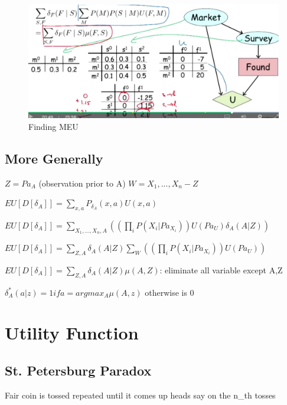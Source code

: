 \documentclass{book}
\begin{document}
\begin{figure}[h]
\centering
\includegraphics[width=0.7\linewidth]{./figures/MEU}
\caption{Finding MEU}
\label{fig:MEU}
\end{figure}

\subsection{More Generally}

$Z = Pa_A$ (observation prior to A)
$W = {X_1,...,X_n} - Z$

$EU[D[\delta_A]] = \sum_{x,a} P_{\delta_A}(x,a) U(x,a)$ 

$EU[D[\delta_A]]= \sum_{X_1,...,X_n,A}((\prod_{i} P(X_i|Pa_{X_i}))U(Pa_U)\delta_A(A|Z))$

$EU[D[\delta_A]]= \sum_{Z,A} \delta_A(A|Z) \sum_{W}((\prod_i P(X_i|Pa_{X_i}))U(Pa_U))$

$EU[D[\delta_A]]= \sum_{Z,A} \delta_A(A|Z) \mu(A,Z) $: eliminate all variable except A,Z

$\delta_A^*(a|z) = 1 if a=argmax_A\mu(A,z)$ otherwise is 0


\section{Utility Function}
\subsection{St. Petersburg Paradox}

Fair coin is tossed repeated until it comes up heads say on the n_th tosses
 
 
\end{document}
